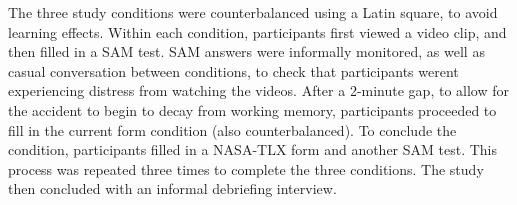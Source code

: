 \documentclass[../main/Feedback.tex]{subfiles}
\begin{document}
The three study conditions were counterbalanced using a Latin square, to avoid learning effects. Within each condition, participants first viewed a video clip, and then filled in a SAM test. SAM answers were informally monitored, as well as casual conversation between conditions, to check that participants werent experiencing distress from watching the videos. After a 2-minute gap, to allow for the accident to begin to decay from working memory, participants proceeded to fill in the current form condition (also counterbalanced). To conclude the condition, participants filled in a NASA-TLX form and another SAM test.
This process was repeated three times to complete the three conditions.
The study then concluded with an informal debriefing interview.
\end{document}
